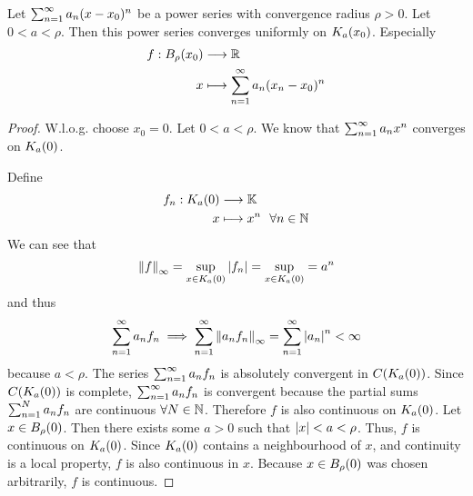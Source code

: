 \documentclass[../../script.tex]{subfiles}
\begin{document}
\begin{thm}
    Let $\series{n} a_n (x - x_0)^n$ be a power series with convergence radius $\rho > 0$. 
    Let $0 < a < \rho$. Then this power series converges uniformly on $\cball[a](x_0)$. Especially
    \begin{align*}
        f: \oball[\rho](x_0) &\longrightarrow \realn \\
        x &\longmapsto \series{n} a_n (x_n - x_0)^n
    \end{align*}
\end{thm}
\begin{proof}
    W.l.o.g. choose $x_0 = 0$. Let $0 < a < \rho$. We know that $\series{n} a_nx^n$ converges on $\cball[a](0)$. 
    
    \begin{center}
    \end{center}

    Define 
    \begin{equation}
    \begin{split}
        f_n: \cball[a](0) &\longrightarrow \field \\
        x &\longmapsto x^n ~~\forall n \in \natn
    \end{split}
    \end{equation}
    We can see that 
    \begin{equation}
        \supnorm{f} = \sup_{x \in \cball[a](0)} \abs{f_n} = \sup_{x \in \cball[a](0)} = a^n
    \end{equation}
    and thus 
    \begin{equation}
        \series{n} a_n f_n \implies \series{n} \supnorm{a_n f_n} = \series{n} \abs{a_n}^n < \infty
    \end{equation}
    because $a < \rho$. The series $\series{n} a_n f_n$ is absolutely convergent in $C(\cball[a](0))$.
    Since $C(\cball[a](0))$ is complete, $\series{n} a_n f_n$ is convergent because the partial sums $\series[N]{n} a_n f_n$ are continuous $\forall N \in \natn$.
    Therefore $f$ is also continuous on $\cball[a](0)$. Let $x \in \oball[\rho](0)$. Then there exists some $a > 0$ such that $\abs{x} < a < \rho$.
    Thus, $f$ is continuous on $\cball[a](0)$. Since $\cball[a](0)$ contains a neighbourhood of $x$, and continuity is a local property,
    $f$ is also continuous in $x$. Because $x \in \oball[\rho](0)$ was chosen arbitrarily, $f$ is continuous.
\end{proof}
\end{document}
